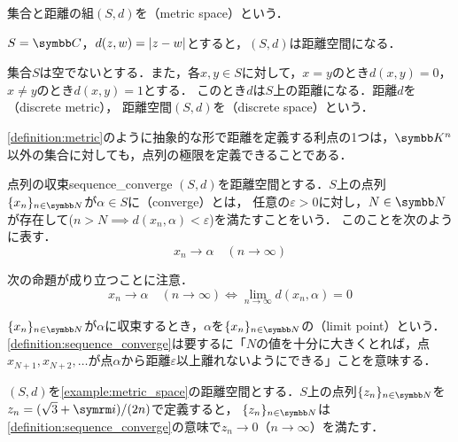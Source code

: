 \documentclass[../../main]{subfiles}
\begin{document}
集合と距離の組\((S,d)\)を（metric space）という．

\begin{example}
  \label{example:metric_space}
  \(S=\numset{C}\)，\(d(z,w)=\lvert z-w\rvert\)とすると，\((S,d)\)は距離空間になる．
\end{example}

\begin{example}[離散距離]
  \label{example:discrete_metric}
  集合\(S\)は空でないとする．また，各\(x,y\in S\)に対して，\(x=y\)のとき\(d(x,y)=0\)，\(x\neq y\)のとき\(d(x,y)=1\)とする．
  このとき\(d\)は\(S\)上の距離になる．距離\(d\)を（discrete metric），
  距離空間\((S,d)\)を（discrete space）という．
\end{example}

\cref{definition:metric}のように抽象的な形で距離を定義する利点の1つは，\(\numset{K}^n\)以外の集合に対しても，点列の極限を定義できることである．

\begin{definition}{点列の収束}{sequence_converge}
  \((S,d)\)を距離空間とする．\(S\)上の点列\(\seq{x_n}_{n\in\numset{N}}\)が\(\alpha\in S\)に（converge）とは，
  任意の\(\varepsilon>0\)に対し，\(N\in\numset{N}\)が存在して(\(n>N\implies d(x_n,\alpha)<\varepsilon\))を満たすことをいう．
  このことを次のように表す．
  \[
    x_n\to\alpha\quad(n\to\infty)
  \]
\end{definition}

\begin{note}
  次の命題が成り立つことに注意．
  \[
    x_n \to \alpha\quad(n\to\infty)
    \iff\lim_{n\to\infty}d(x_n,\alpha) = 0
  \]
\end{note}

\(\seq{x_n}_{n\in\numset{N}}\)が\(\alpha\)に収束するとき，\(\alpha\)を\(\seq{x_n}_{n\in\numset{N}}\)の（limit point）という．
\cref{definition:sequence_converge}は要するに「\(N\)の値を十分に大きくとれば，点\(x_{N+1},x_{N+2},\dotsc\)が点\(\alpha\)から距離\(\varepsilon\)以上離れないようにできる」ことを意味する．

\begin{example}
  \label{example:complex_planes_convergence}
  \((S,d)\)を\cref{example:metric_space}の距離空間とする．\(S\)上の点列\(\seq{z_n}_{n\in\numset{N}}\)を\(z_n=(\sqrt{3}+\iuni)/(2n)\)で定義すると，
  \(\seq{z_n}_{n\in\numset{N}}\)は\cref{definition:sequence_converge}の意味で\(z_n\to 0\)（\(n\to\infty\)）を満たす．
\end{example}
\end{document}
